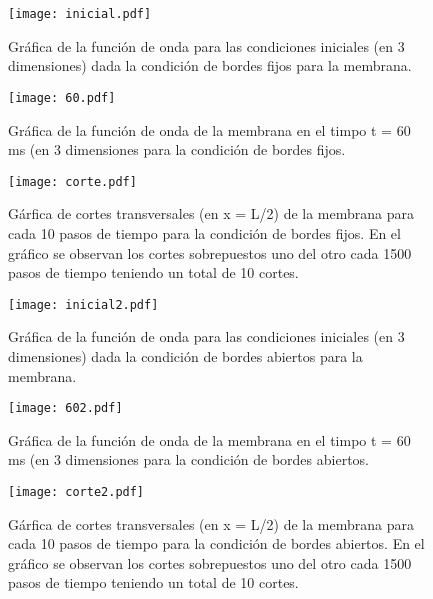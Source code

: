 \documentclass[11pt,letterpaper]{exam}
\begin{document}
\begin{figure}[H]
\begin{center}
\texttt{[image: inicial.pdf]}
\caption{\label{fig:typical}Gr\'afica de la funci\'on de onda para las condiciones iniciales (en 3 dimensiones) dada la condici\'on de bordes fijos para la membrana.}
\end{center}
\end{figure}


\begin{figure}[H]
\begin{center}
\texttt{[image: 60.pdf]}
\caption{\label{fig:typical}Gr\'afica de la funci\'on de onda de la membrana en el timpo t = 60 ms (en 3 dimensiones  para la condici\'on de bordes fijos.}
\end{center}
\end{figure}


\begin{figure}[H]
\begin{center}
\texttt{[image: corte.pdf]}
\caption{\label{fig:typical}G\'arfica de cortes transversales (en x = L/2) de la membrana para cada 10 pasos de tiempo para la condici\'on de bordes fijos. En el gr\'afico se observan los cortes sobrepuestos uno del otro cada 1500 pasos de tiempo teniendo un total de 10 cortes.}
\end{center}
\end{figure}



\begin{figure}[H]
\begin{center}
\texttt{[image: inicial2.pdf]}
\caption{\label{fig:typical}Gr\'afica de la funci\'on de onda para las condiciones iniciales (en 3 dimensiones) dada la condici\'on de bordes abiertos para la membrana.}
\end{center}
\end{figure}


\begin{figure}[H]
\begin{center}
\texttt{[image: 602.pdf]}
\caption{\label{fig:typical}Gr\'afica de la funci\'on de onda de la membrana en el timpo t = 60 ms (en 3 dimensiones  para la condici\'on de bordes abiertos.}
\end{center}
\end{figure}


\begin{figure}[H]
\begin{center}
\texttt{[image: corte2.pdf]}
\caption{\label{fig:typical}G\'arfica de cortes transversales (en x = L/2) de la membrana para cada 10 pasos de tiempo para la condici\'on de bordes abiertos. En el gr\'afico se observan los cortes sobrepuestos uno del otro cada 1500 pasos de tiempo teniendo un total de 10 cortes.}
\end{center}
\end{figure}
\end{document}
